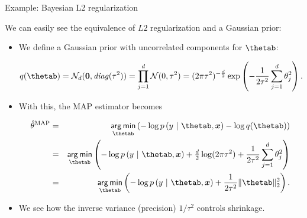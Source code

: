 \begin{vbframe}{Example: Bayesian L2 regularization}

\small We can easily see the equivalence of $L2$ regularization and a Gaussian 
prior:

\begin{itemize}
  \small
  \item We define a Gaussian prior with uncorrelated components for $\thetab$:
  \begin{footnotesize}
    $$q(\thetab) = \mathcal{N}_d(\bm{0}, \mathit{diag}(\tau^2)) 
    = \prod_{j = 1}^d  \mathcal{N}(0, \tau^2)  
    = (2\pi\tau^2)^{-\frac{d}{2}} \exp \left( - \frac{1}{2\tau^2} \sum_{j = 1}^d 
    \theta_j^2 \right).$$
  \end{footnotesize} 
  \item With this, the MAP estimator becomes
  \begin{footnotesize}
  \begin{eqnarray*}
    \thetah^{\text{MAP}} &=& \argmin_{\thetab} \left(
    - \log p\left(y ~|~ \thetab, \xv \right) - \log q(\thetab)
    \right) \\
    &=& \argmin_{\thetab} \left(
    - \log p\left(y ~|~ \thetab, \xv \right) + \tfrac{d}{2} \log(2\pi \tau^2) +
    \frac{1}{2\tau^2} \sum_{j = 1}^d \theta_j^2
    \right) \\
    &=& \argmin_{\thetab} \left(
    - \log p\left(y ~|~ \thetab, \xv \right) + \frac{1}{2\tau^2} \| \thetab \|_2^2
    \right).
  \end{eqnarray*}
  \end{footnotesize} 
  \item We see how the inverse variance (precision) $1/\tau^2$ controls shrinkage.
\end{itemize}
  


\end{vbframe}
